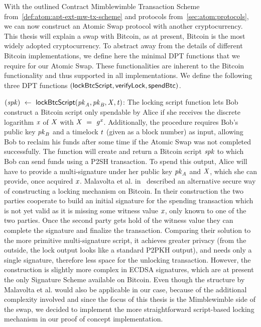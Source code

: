 With the outlined Contract Mimblewimble Transaction Scheme from~\cref{def:atom:apt-ext-mw-tx-scheme} and protocols from~\cref{sec:atom:protocols}, we can now construct an Atomic Swap protocol with another cryptocurrency.
This thesis will explain a swap with Bitcoin, as at present, Bitcoin is the most widely adopted cryptocurrency.
To abstract away from the details of different Bitcoin implementations, we define here the minimal DPT functions that we require for our Atomic Swap.
These functionalities are inherent to the Bitcoin functionality and thus supported in all implementations.
We define the following three DPT functions $(\mathsf{lockBtcScript}, \mathsf{verifyLock}, \mathsf{spendBtc})$.
\begin{asparaitem}
    \item $(\mathit{spk}) ~\leftarrow~ \mathsf{lockBtcScript} (\mathit{pk}_{\mathit{A}},\mathit{pk}_{\mathit{B}},\mathit{X},\mathit{t})$:
    The locking script function lets Bob construct a Bitcoin script only spendable by Alice if she receives the discrete logarithm $\mathit{x}$ of $\mathit{X}$ with $\mathit{X} ~=~ \mathit{g}^{\mathit{x}}$.
    Additionally, the procedure requires Bob's public key $\mathit{pk}_{\mathit{B}}$ and a timelock $\mathit{t}$ (given as a block number) as input, allowing Bob to reclaim his funds after some time if the Atomic Swap was not completed successfully.
    The function will create and return a Bitcoin script $\mathit{spk}$ to which Bob can send funds using a P2SH transaction.
    To spend this output, Alice will have to provide a multi-signature under her public key $\mathit{pk}_{\mathit{A}}$ and $\mathit{X}$, which she can provide, once acquired $\mathit{x}$.
    Malavolta et al. in~\cite{malavolta2019anonymous} described an alternative secure way of constructing a locking mechanism on Bitcoin.
    In their construction the two parties cooperate to build an initial signature for the spending transaction which is not yet valid as it is missing some witness value $\mathit{x}$, only known to one of the two parties.
    Once the second party gets hold of the witness value they can complete the signature and finalize the transaction.
    Comparing their solution to the more primitive multi-signature script, it achieves greater privacy (from the outside, the lock output looks like a standard P2PKH output), and needs only a single signature, therefore less space for the unlocking transaction.
    However, the construction is slightly more complex in ECDSA signatures, which are at present the only Signature Scheme available on Bitcoin.
    Even though the structure by Malavolta et al. would also be applicable in our case, because of the additional complexity involved and since the focus of this thesis is the Mimblewimble side of the swap, we decided to implement the more straightforward script-based locking mechanism in our proof of concept implementation.

\end{asparaitem}
